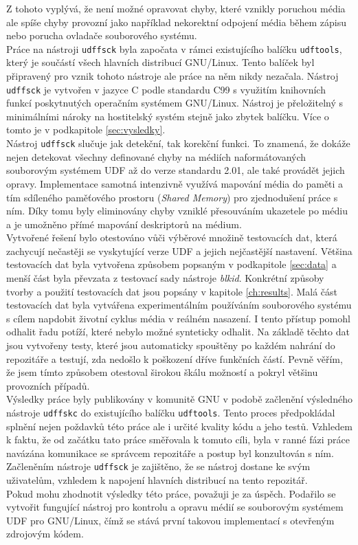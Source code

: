 Z tohoto vyplývá, že není možné opravovat chyby, které vznikly poruchou média ale spíše chyby provozní jako například nekorektní odpojení média během zápisu nebo porucha ovladače souborového systému.\\
Práce na nástroji \texttt{udffsck} byla započata v rámci existujícího balíčku \texttt{udftools}, který je součástí všech hlavních distribucí GNU/Linux. Tento balíček byl připravený pro vznik tohoto nástroje ale práce na něm nikdy nezačala. Nástroj \texttt{udffsck} je vytvořen v jazyce C podle standardu C99 s využitím knihovních funkcí poskytnutých operačním systémem \mbox{GNU/Linux}. Nástroj je přeložitelný s minimálními nároky na hostitelský systém stejně jako zbytek balíčku. Více o tomto je v podkapitole \ref{sec:vysledky}.\\
Nástroj \texttt{udffsck} slučuje jak detekční, tak korekční funkci. To znamená, že dokáže nejen detekovat všechny definované chyby na médiích naformátovaných souborovým systémem UDF až do verze standardu 2.01, ale také provádět jejich opravy. Implementace samotná intenzivně využívá mapování média do paměti a tím sdíleného paměťového prostoru (\textit{Shared Memory}) pro zjednodušení práce s ním. Díky tomu byly eliminovány chyby vzniklé přesouváním ukazetele po médiu a je umožněno přímé mapování deskriptorů na médium.\\
Vytvořené řešení bylo otestováno vůči výběrové množině testovacích dat, která zachycují nečastěji se vyskytující verze UDF a jejich nejčastější nastavení. Většina testovacích dat byla vytvořena způsobem popsaným v podkapitole \ref{sec:data} a menší část byla převzata z testovací sady nástroje \textit{blkid}. Konkrétní způsoby tvorby a použití testovacích dat jsou popsány v kapitole \ref{ch:results}. Malá část testovacích dat byla vytvářena experimentálním používáním souborového systému s cílem napdobit životní cyklus média v reálném nasazení. I tento přístup pomohl odhalit řadu potíží, které nebylo možné synteticky odhalit. Na základě těchto dat jsou vytvořeny testy, které jsou automaticky spouštěny po každém nahrání do repozitáře a testují, zda nedošlo k poškození dříve funkčních částí. Pevně věřím, že jsem tímto způsobem otestoval širokou škálu možností a pokryl většinu provozních případů.\\
Výsledky práce byly publikovány v komunitě GNU v podobě začlenění výsledného nástroje \texttt{udffskc} do existujícího balíčku \texttt{udftools}. Tento proces předpokládal splnění nejen poždavků této práce ale i určité kvality kódu a jeho testů. Vzhledem k faktu, že od začátku tato práce směřovala k tomuto cíli, byla v ranné fázi práce navázána komunikace se správcem repozitáře a postup byl konzultován s ním. Začleněním nástroje \texttt{udffsck} je zajištěno, že se nástroj dostane ke svým uživatelům, vzhledem k napojení hlavních distribucí na tento repozitář.\\
Pokud mohu zhodnotit výsledky této práce, považuji je za úspěch. Podařilo se vytvořit fungující nástroj pro kontrolu a opravu médií se souborovým systémem UDF pro GNU/Linux, čímž se stává první takovou implementací s otevřeným zdrojovým kódem.

